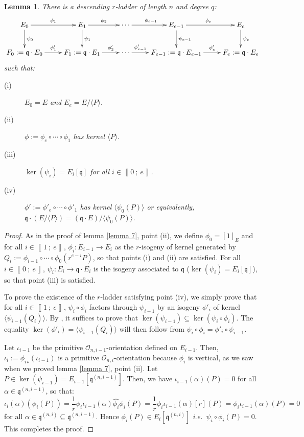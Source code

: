 \documentclass[a4paper,10pt]{report}
\theoremstyle{definition}
\theoremstyle{plain}
\newtheorem{lemma}[definition]{Lemma}
\theoremstyle{definition}
\newcommand{\ie}{\emph{i.e.}\ }
\newcommand{\mO}{\mathcal{O}}
\renewcommand{\i}[2]{\left\llbracket #1~;~#2\right\rrbracket}
\renewcommand{\(}{\left(}
\renewcommand{\)}{\right)}
\newcommand{\mf}[1]{\mathfrak{#1}}
\begin{document}
\begin{lemma}\label{lemma 8}
There is a descending $r$-ladder of length $n$ and degree $q$:
\[\xymatrix{
E_0 \ar[d]^{\psi_0} \ar[r]^{\phi_1} & E_1\ar[d]^{\psi_1} \ar[r]^{\phi_{2}}& \cdots \ar[r]^{\phi_{e-1}} & E_{e-1} \ar[d]^{\psi_{e-1}} \ar[r]^{\phi_{e}} & E_e \ar[d]^{\psi_e}\\
F_0:=\mf{q}\cdot E_0 \ar[r]^-{\phi'_1} & F_1:=\mf{q}\cdot E_1 \ar[r]^-{\phi'_{2}}& \cdots \ar[r]^-{\phi'_{e-1}} & F_{e-1}:=\mf{q}\cdot E_{e-1} \ar[r]^-{\phi'_{e}} & F_e:=\mf{q}\cdot E_e
}\]
such that: 
\begin{description}
\item[(i)] $E_0=E$ and $E_e=E/\langle P\rangle$.
\item[(ii)] $\phi:=\phi_e\circ\cdots\circ\phi_1$ has kernel $\langle P\rangle$.
\item[(iii)] $\ker(\psi_i)=E_i[\mf{q}]$ for all $i\in\i{0}{e}$.
\item[(iv)] $\phi':=\phi'_e\circ\cdots\circ\phi'_1$ has kernel $\langle \psi_0(P)\rangle$ or equivalently, $\mf{q}\cdot(E/\langle P\rangle)=(\mf{q}\cdot E)/\langle \psi_0(P)\rangle$.
\end{description}
\end{lemma}

\begin{proof}
As in the proof of lemma \ref{lemma 7}, point (ii), we define $\phi_0=[1]_E$ and for all $i\in\i{1}{e}$, $\phi_i :E_{i-1}\longrightarrow E_i$ as the $r$-isogeny of kernel generated by $Q_i:=\phi_{i-1}\circ\cdots\circ\phi_0(r^{e-i}P)$, so that points (i) and (ii) are satisfied. For all $i\in\i{0}{e}$, $\psi_i:E_i\longrightarrow \mf{q}\cdot E_i$ is the isogeny associated to $\mf{q}$ ($\ker(\psi_i)=E_i[\mf{q}]$), so that point (iii) is satisfied. 

To prove the existence of the $r$-ladder satisfying point (iv), we simply prove that for all $i\in\i{1}{e}$, $\psi_i\circ\phi_i$ factors through $\psi_{i-1}$ by an isogeny $\phi'_i$ of kernel $\langle \psi_{i-1}(Q_i)\rangle$.  By \cite[corollary III.4.11]{Silverman1}, it suffices to prove that $\ker(\psi_{i-1})\subseteq \ker(\psi_i\circ\phi_i)$. The equality $\ker(\phi'_i)=\langle \psi_{i-1}(Q_i)\rangle$ will then follow from $\psi_i\circ\phi_i=\phi'_i\circ\psi_{i-1}$. 

Let $\iota_{i-1}$ be the primitive $\mO_{n,i-1}$-orientation defined on $E_{i-1}$. Then, $\iota_i:={\phi_{i}}_{*}(\iota_{i-1})$ is a primitive $\mO_{n,i}$-orientation because $\phi_{i}$ is vertical, as we saw when we proved lemma \ref{lemma 7}, point (ii). Let $P\in\ker(\psi_{i-1})=E_{i-1}[\mf{q}^{(n,i-1)}]$. Then, we have $\iota_{i-1}(\alpha)(P)=0$ for all $\alpha\in\mf{q}^{(n,i-1)}$, so that:
\[\iota_{i}(\alpha)(\phi_i(P))=\frac{1}{r}\phi_i\iota_{i-1}(\alpha)\widehat{\phi_i}\phi_i(P)=\frac{1}{r}\phi_i\iota_{i-1}(\alpha)[r](P)=\phi_i\iota_{i-1}(\alpha)(P)=0\]
for all $\alpha\in \mf{q}^{(n,i)}\subseteq \mf{q}^{(n,i-1)}$. Hence $\phi_i(P)\in E_i[ \mf{q}^{(n,i)}]$ \ie $\psi_i\circ\phi_i(P)=0$. This completes the proof.
\end{proof}
\end{document}
